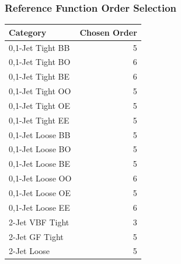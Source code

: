 \documentclass{beamer}
\begin{document}
\begin{frame}
\frametitle{Reference Function Order Selection}
\scriptsize
\begin{center}
\begin{tabular}{|l|r|} \hline
Category             & Chosen Order \\ \hline \hline
0,1-Jet Tight BB     & 5             \\ \hline
0,1-Jet Tight BO     &  6            \\ \hline
0,1-Jet Tight BE     &   6           \\ \hline
0,1-Jet Tight OO     &  5          \\ \hline
0,1-Jet Tight OE     &   5         \\ \hline
0,1-Jet Tight EE     &    5        \\ \hline
0,1-Jet Loose BB     &     5       \\ \hline
0,1-Jet Loose BO     & 5      \\ \hline
0,1-Jet Loose BE     &  5     \\ \hline
0,1-Jet Loose OO     &   6    \\ \hline
0,1-Jet Loose OE     &    5   \\ \hline
0,1-Jet Loose EE     &     6  \\ \hline
2-Jet VBF Tight      &  3            \\ \hline
2-Jet GF Tight       &   5           \\ \hline
2-Jet Loose          &   5           \\ \hline
\end{tabular}
\small
\end{center}
\end{frame}


\end{document}
